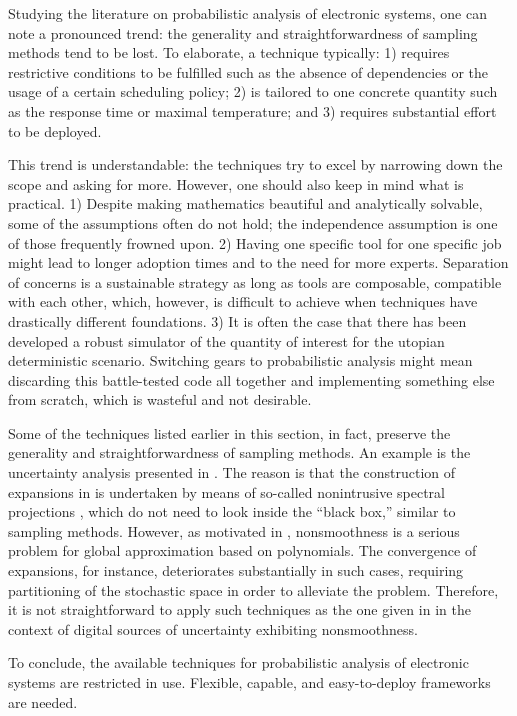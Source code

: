 Studying the literature on probabilistic analysis of electronic systems, one can
note a pronounced trend: the generality and straightforwardness of sampling
methods tend to be lost. To elaborate, a technique typically: 1) requires
restrictive conditions to be fulfilled such as the absence of dependencies or
the usage of a certain scheduling policy; 2) is tailored to one concrete
quantity such as the response time or maximal temperature; and 3) requires
substantial effort to be deployed.

This trend is understandable: the techniques try to excel by narrowing down the
scope and asking for more. However, one should also keep in mind what is
practical. 1) Despite making mathematics beautiful and analytically solvable,
some of the assumptions often do not hold; the independence assumption is one of
those frequently frowned upon. 2) Having one specific tool for one specific job
might lead to longer adoption times and to the need for more experts. Separation
of concerns is a sustainable strategy as long as tools are composable,
compatible with each other, which, however, is difficult to achieve when
techniques have drastically different foundations. 3) It is often the case that
there has been developed a robust simulator of the quantity of interest for the
utopian deterministic scenario. Switching gears to probabilistic analysis might
mean discarding this battle-tested code all together and implementing something
else from scratch, which is wasteful and not desirable.

Some of the techniques listed earlier in this section, in fact, preserve the
generality and straightforwardness of sampling methods. An example is the
uncertainty analysis presented in \cite{ukhov2015}. The reason is that the
construction of  expansions in \cite{ukhov2015} is undertaken by means
of so-called nonintrusive spectral projections \cite{xiu2010}, which do not need
to look inside the ``black box,'' similar to sampling methods. However, as
motivated in , nonsmoothness is a serious problem for global
approximation based on polynomials. The convergence of  expansions, for
instance, deteriorates substantially in such cases, requiring partitioning of
the stochastic space in order to alleviate the problem. Therefore, it is not
straightforward to apply such techniques as the one given in \cite{ukhov2015} in
the context of digital sources of uncertainty exhibiting nonsmoothness.

To conclude, the available techniques for probabilistic analysis of electronic
systems are restricted in use. Flexible, capable, and easy-to-deploy frameworks
are needed.

